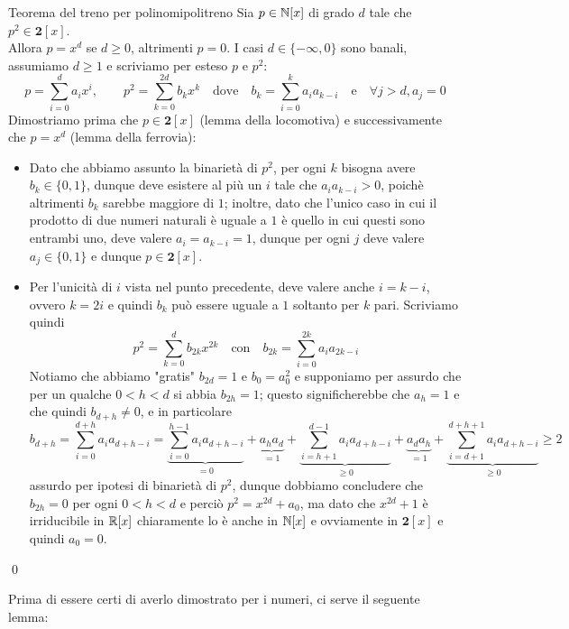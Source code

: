 \documentclass{article}
\begin{document}
\begin{theorem}{Teorema del treno per polinomi}{politreno}
    Sia $p \in \mathbb{N}[x]$ di grado $d$ tale che $p^2 \in \mathbf{2}[x]$.\\
    Allora $p = x^d$ se $d\ge 0$, altrimenti $p=0$.
    \proof 
    I casi $d\in\{-\infty, 0\}$ sono banali, assumiamo $d\ge 1$ e scriviamo per esteso $p$ e $p^2$:
    \[p = \sum_{i=0}^d a_i x^i, \qquad p^2 = \sum_{k=0}^{2d} b_k x^k \quad\text{dove}\quad b_k = \sum_{i=0}^k a_i a_{k-i} \quad\text{e}\quad \forall j > d, a_j=0\]
    Dimostriamo prima che $p \in \mathbf{2}[x]$ (lemma della locomotiva) e successivamente che $p = x^d$ (lemma della ferrovia):\begin{itemize}
        \item Dato che abbiamo assunto la binarietà di $p^2$, per ogni $k$ bisogna avere $b_k \in\{0,1\}$, dunque deve esistere al più un $i$ tale che $a_i a_{k-i} > 0$, poichè altrimenti $b_k$ sarebbe maggiore di $1$; inoltre, dato che l'unico caso in cui il prodotto di due numeri naturali è uguale a $1$ è quello in cui questi sono entrambi uno, deve valere $a_i = a_{k-i} = 1$, dunque per ogni $j$ deve valere $a_j \in \{0,1\}$ e dunque $p \in \mathbf{2}[x]$.
        \item Per l'unicità di $i$ vista nel punto precedente, deve valere anche $i = k-i$, ovvero $k = 2i$ e quindi $b_k$ può essere uguale a $1$ soltanto per $k$ pari. Scriviamo quindi
        \[ p^2 = \sum_{k=0}^d b_{2k} x^{2k} \quad \text{con}\quad b_{2k} = \sum_{i=0}^{2k}a_{i}a_{2k-i} \]
        Notiamo che abbiamo "gratis" $b_{2d} = 1$ e $b_0 = a_0^2$ e supponiamo per assurdo che per un qualche $0<h<d$ si abbia $b_{2h}=1$; questo significherebbe che $a_{h}=1$ e che quindi $b_{d+h}\neq 0$, e in particolare
        \[ b_{d+h} = \sum_{i=0}^{d+h} a_i a_{d+h-i} = \underbrace{\sum_{i=0}^{h-1} a_ia_{d+h-i}}_{=0} + \underbrace{a_{h}a_{d}}_{=1} + \underbrace{\sum_{i = h+1}^{d-1} a_{i} a_{d+h-i} }_{\ge 0} + \underbrace{a_{d}a_{h}}_{=1} + \underbrace{\sum_{i=d+1}^{d+h+1}a_i a_{d+h-i}}_{\ge 0}\ge 2\]
        assurdo per ipotesi di binarietà di $p^2$, dunque dobbiamo concludere che $b_{2h} = 0$ per ogni $0<h<d$ e perciò $p^2 = x^{2d} + a_0$, ma dato che $x^{2d} +1$ è irriducibile in $\mathbb{R}[x]$ chiaramente lo è anche in $\mathbb{N}[x]$ e ovviamente in $\mathbf{2}[x]$ e quindi $a_0 = 0$.
    \end{itemize}
    \qed
\end{theorem}

Prima di essere certi di averlo dimostrato per i numeri, ci serve il seguente lemma:
\end{document}
